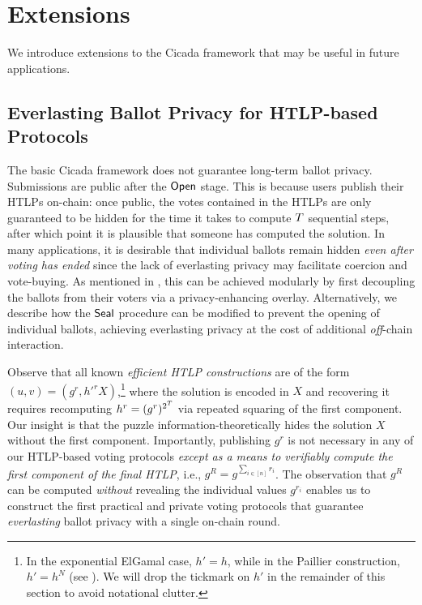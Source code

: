 \section{Extensions}\label{sec:cicada_extensions}
We introduce extensions to the Cicada framework that may be useful in future applications.

\subsection{Everlasting Ballot Privacy for HTLP-based Protocols}\label{sec:everlasting_ballot_privacy}



The basic Cicada framework does not guarantee long-term ballot privacy. Submissions are public after the $\mathsf{Open}$ stage. This is because users publish their HTLPs on-chain: once public, the votes contained in the HTLPs are only guaranteed to be hidden for the time it takes to compute $T$ sequential steps, after which point it is plausible that someone has computed the solution. In many applications, it is desirable that individual ballots remain hidden \emph{even after voting has ended} since the lack of everlasting privacy may facilitate coercion and vote-buying. As mentioned in , this can be achieved modularly by first decoupling the ballots from their voters via a privacy-enhancing overlay. Alternatively, we describe how the $\mathsf{Seal}$ procedure can be modified to prevent the opening of individual ballots, achieving everlasting privacy at the cost of additional \emph{off}-chain interaction.

Observe that all known \emph{efficient HTLP constructions} are of the form $(u,v) = (g^r, {h'}^r X)$,\footnote{In the exponential ElGamal case, $h' = h$, while in the Paillier construction, $h' = h^N$ (see ). We will drop the tickmark on $h'$ in the remainder of this section to avoid notational clutter.} where the solution is encoded in $X$ and recovering it requires recomputing $h^r=(g^{r})^{2^{T}}$ via repeated squaring of the first component. Our insight is that the puzzle information-theoretically hides the solution $X$ without the first component. Importantly, publishing $g^r$ is not necessary in any of our HTLP-based voting protocols \emph{except as a means to verifiably compute the first component of the final HTLP}, i.e., $g^{R}=g^{\sum_{i\in[n]} r_i}$. The observation that $g^R$ can be computed \emph{without} revealing the individual values $g^{r_i}$ enables us to construct the first practical and private voting protocols that guarantee \emph{everlasting} ballot privacy with a single on-chain round.


